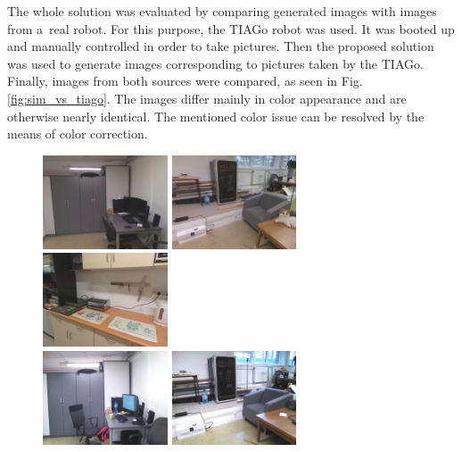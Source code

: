 \documentclass{svproc}
\begin{document}
The whole solution was evaluated by comparing generated images with images from a~real robot.
For this purpose, the TIAGo robot was used.
It was booted up and manually controlled in order to take pictures.
Then the proposed solution was used to generate images corresponding to pictures taken by the TIAGo.
Finally, images from both sources were compared, as seen in Fig. \ref{fig:sim_vs_tiago}. The images 
differ mainly in color appearance and are otherwise nearly identical. The mentioned color issue can 
be resolved by the means of color correction.

\begin{figure}[!ht]
    \centering
    \includegraphics[width=0.33\textwidth]{img/sim_vs_tiago/sim_biurko.jpg}\hfill%
    \includegraphics[width=0.33\textwidth]{img/sim_vs_tiago/sim_fotel.jpg}\hfill%
    \includegraphics[width=0.33\textwidth]{img/sim_vs_tiago/sim_kuchnia_blat.jpg}\\
    \includegraphics[width=0.33\textwidth]{img/sim_vs_tiago/tia_biurko.jpg}\hfill%
    \includegraphics[width=0.33\textwidth]{img/sim_vs_tiago/tia_fotel.jpg}\hfill%

\end{figure}
\end{document}

